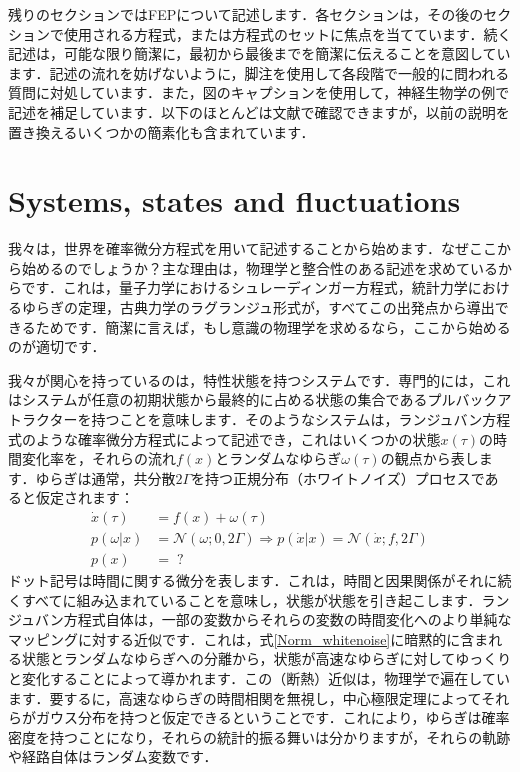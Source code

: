 \documentclass[a4paper, titlepage]{jsarticle}
\begin{document}
\par
残りのセクションではFEPについて記述します．各セクションは，その後のセクションで使用される方程式，または方程式のセットに焦点を当てています．続く記述は，可能な限り簡潔に，最初から最後までを簡潔に伝えることを意図しています．記述の流れを妨げないように，脚注を使用して各段階で一般的に問われる質問に対処しています．また，図のキャプションを使用して，神経生物学の例で記述を補足しています．以下のほとんどは文献で確認できますが，以前の説明を置き換えるいくつかの簡素化も含まれています．

\section{Systems, states and fluctuations}
我々は，世界を確率微分方程式を用いて記述することから始めます．なぜここから始めるのでしょうか？主な理由は，物理学と整合性のある記述を求めているからです．これは，量子力学におけるシュレーディンガー方程式，統計力学におけるゆらぎの定理，古典力学のラグランジュ形式が，すべてこの出発点から導出できるためです．簡潔に言えば，もし意識の物理学を求めるなら，ここから始めるのが適切です．
\par
我々が関心を持っているのは，特性状態を持つシステムです．専門的には，これはシステムが任意の初期状態から最終的に占める状態の集合であるプルバックアトラクターを持つことを意味します．そのようなシステムは，ランジュバン方程式のような確率微分方程式によって記述でき，これはいくつかの状態$x(\tau)$の時間変化率を，それらの流れ$f(x)$とランダムなゆらぎ$\omega(\tau)$の観点から表します．ゆらぎは通常，共分散$2\Gamma$を持つ正規分布（ホワイトノイズ）プロセスであると仮定されます：
\begin{equation}\label{Norm_whitenoise}
    \begin{aligned}
        \dot{x}(\tau) &= f(x) + \omega(\tau) \\
        p(\omega | x) &= \mathcal{N}(\omega; 0, 2\Gamma) \Rightarrow p(\dot{x} | x) = \mathcal{N}(\dot{x}; f, 2\Gamma) \\
        p(x) &=\;?
    \end{aligned}
\end{equation}
ドット記号は時間に関する微分を表します．これは，時間と因果関係がそれに続くすべてに組み込まれていることを意味し，状態が状態を引き起こします．ランジュバン方程式自体は，一部の変数からそれらの変数の時間変化へのより単純なマッピングに対する近似です．これは，式\eqref{Norm_whitenoise}に暗黙的に含まれる状態とランダムなゆらぎへの分離から，状態が高速なゆらぎに対してゆっくりと変化することによって導かれます．この（断熱）近似は，物理学で遍在しています．要するに，高速なゆらぎの時間相関を無視し，中心極限定理によってそれらがガウス分布を持つと仮定できるということです．これにより，ゆらぎは確率密度を持つことになり，それらの統計的振る舞いは分かりますが，それらの軌跡や経路自体はランダム変数です．
\end{document}
